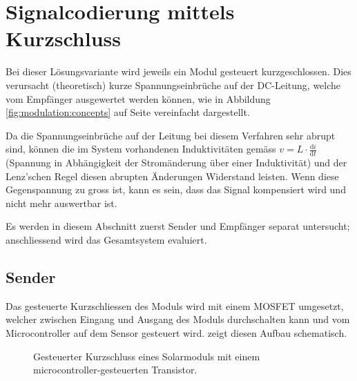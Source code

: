 \clearpage
\section{Signalcodierung mittels Kurzschluss}
\label{sec:simu:short}

Bei   dieser    L\"osungsvariante   wird    jeweils   ein    Modul   gesteuert
kurzgeschlossen. Dies  verursacht   (theoretisch)  kurze  Spannungseinbr\"uche
auf   der    DC-Leitung,   welche    vom   Empf\"anger    ausgewertet   werden
k\"onnen,   wie   in   Abbildung   \ref{fig:modulation:concepts}   auf   Seite
\pageref{fig:modulation:concepts} vereinfacht dargestellt.

Da die Spannungseinbr\"uche  auf der Leitung bei diesem  Verfahren sehr abrupt
sind,  k\"onnen  die im  System  vorhandenen  Induktivit\"aten gem\"ass  $v  =
L  \cdot  \frac{\mathrm{d}i}{\mathrm{d}t}$  (Spannung  in  Abh\"angigkeit  der
Strom\"anderung \"uber  einer Induktivit\"at) und der  Lenz'schen Regel diesen
abrupten \"Anderungen  Widerstand leisten. Wenn  diese Gegenspannung  zu gross
ist, kann es sein, dass das  Signal kompensiert wird und nicht mehr auswertbar
ist.

Es  werden  in   diesem  Abschnitt  zuerst  Sender   und  Empf\"anger  separat
untersucht; anschliessend wird das Gesamtsystem evaluiert.


\subsection{Sender}
\label{subsec:simu:ask:sensor}

Das  gesteuerte Kurzschliessen  des Moduls  wird mit  einem MOSFET  umgesetzt,
welcher zwischen  Eingang und  Ausgang des Moduls  durchschalten kann  und vom
Microcontroller auf dem Sensor gesteuert wird. 
zeigt diesen Aufbau schematisch.

\begin{figure}
    \vspace*{-1em}
    \centering
    
    \caption[Grundprinzip Kurzschluss mit Transistor]{%
        Gesteuerter     Kurzschluss     eines    Solarmoduls     mit     einem
        microcontroller-gesteuerten Transistor.%
    }
    \label{fig:module:mosfet:simple}
    \vspace*{-1.0em}
\end{figure}

